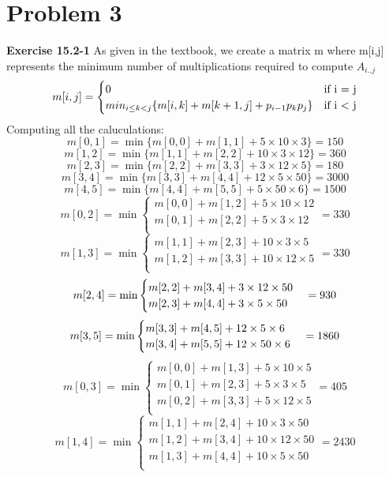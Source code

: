 \documentclass[10pt]{article}
\begin{document}
\section{Problem 3}
\textbf{Exercise 15.2-1}
As given in the textbook, we create a matrix m where m[i,j] represents the minimum number of multiplications required to compute $A_{i..j}$
\[
m[i,j] = 
\begin{cases}
0\hfill & \text{if i = j}\\
min_{i \leq k < j}\{m[i,k] +  m[k+1,j] + p_{i-1}p_{k}p_{j} \}\hfill & \text{if i $<$ j}\\
\end{cases}
\]
Computing all the caluculations:
$$m[0,1] = \min\{m[0,0] + m[1,1] + 5\times10\times3\} = 150$$
$$m[1,2] = \min\{m[1,1] + m[2,2] + 10\times3\times12\} = 360$$
$$m[2,3] = \min\{m[2,2] + m[3,3] + 3\times12\times5\} = 180$$
$$m[3,4] = \min\{m[3,3] + m[4,4] + 12\times5\times50\} = 3000$$
$$m[4,5] = \min\{m[4,4] + m[5,5] + 5\times50\times6\} = 1500$$
\[
m[0,2] = \min
\begin{cases}
m[0,0] + m[1,2] + 5\times10\times12\\
m[0,1] + m[2,2] + 5\times3\times12\\
\end{cases}
= 330
\]
\[
m[1,3] = \min
\begin{cases}
m[1,1] + m[2,3] + 10\times3\times5\\
m[1,2] + m[3,3] + 10\times12\times5\\
\end{cases}
= 330
\]
\[
m[2,4] = \min
\begin{cases}
m[2,2] + m[3,4] + 3\times12\times50\\
m[2,3] + m[4,4] + 3\times5\times50
\end{cases}
= 930\\
\]
\[
m[3,5] = \min
\begin{cases}
m[3,3] + m[4,5] + 12\times5\times6\\
m[3,4] + m[5,5] + 12\times50\times6\\
\end{cases}
= 1860\\
\]
\[
m[0,3]=\min
\begin{cases}
m[0,0] + m[1,3] + 5\times10\times5\\
m[0,1] + m[2,3] + 5\times3\times5\\
m[0,2] + m[3,3] + 5\times12\times5\\
\end{cases}
=405
\]
\[
m[1,4]=\min
\begin{cases}
m[1,1] + m[2,4] + 10\times3\times50\\
m[1,2] + m[3,4] + 10\times12\times50\\
m[1,3] + m[4,4] + 10\times5\times50\\
\end{cases}
=2430
\]
\end{document}
